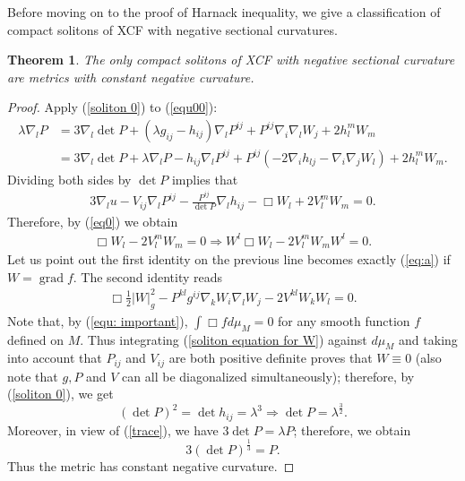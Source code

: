 \documentclass{amsart}
\newtheorem{theorem}{Theorem}
\theoremstyle{definition}
\theoremstyle{remark}
\numberwithin{equation}{section}
\begin{document}
Before moving on to the proof of Harnack inequality, we give a classification of compact solitons of XCF with negative sectional curvatures.
\begin{theorem}
The only compact solitons of XCF with negative sectional curvature are metrics with constant negative curvature.
\end{theorem}
\begin{proof}
Apply (\ref{soliton 0}) to (\ref{equ00}):
\begin{align*}
\lambda \nabla_l P&=3\nabla_l\det P+(\lambda g_{ij}-h_{ij})\nabla_l P^{ij}+P^{ij}\nabla_i\nabla_lW_j+2h_l^mW_m\\
&=3\nabla_l\det P+\lambda \nabla_l P-h_{ij}\nabla_l P^{ij}+P^{ij}(-2\nabla_ih_{lj}-\nabla_i\nabla_jW_l)+2h_l^mW_m.
\end{align*}
Dividing both sides by $\det P$ implies that
\begin{align*}
3\nabla_lu-V_{ij}\nabla_l P^{ij}-\frac{P^{ij}}{\det P}\nabla_lh_{ij}-\Box W_l+2V_l^mW_m=0.
\end{align*}
Therefore, by (\ref{eq0}) we obtain
\begin{align*}
\Box W_l-2V_l^mW_m=0\Rightarrow W^l\Box W_l-2V_l^mW_mW^l=0.
\end{align*}
Let us point out the first identity on the previous line becomes exactly (\ref{eq:a}) if $W=\operatorname{grad} f.$
The second identity reads
\begin{align}\label{soliton equation for W}
\Box \frac{1}{2}|W|_g^2-P^{kl}g^{ij}\nabla_kW_i\nabla_lW_j-2V^{kl}W_kW_l=0.
\end{align}
Note that, by (\ref{equ: important}), $\int \Box fd\mu_{M}=0$ for any smooth function $f$ defined on $M$. Thus integrating (\ref{soliton equation for W}) against $d\mu_{M}$ and taking into account that $P_{ij}$ and $V_{ij}$ are both positive definite proves that $W\equiv0$ (also note that $g,P$ and $V$ can all be diagonalized simultaneously); therefore, by (\ref{soliton 0}), we get
\[(\det P)^2=\det h_{ij}=\lambda ^3\Rightarrow \det P=\lambda^{\frac{3}{2}}.\]
Moreover, in view of (\ref{trace}), we have $3\det P=\lambda P$; therefore, we obtain $$3(\det P)^{\frac{1}{3}}=P.$$ Thus the metric has constant negative curvature.
\end{proof}
\end{document}
